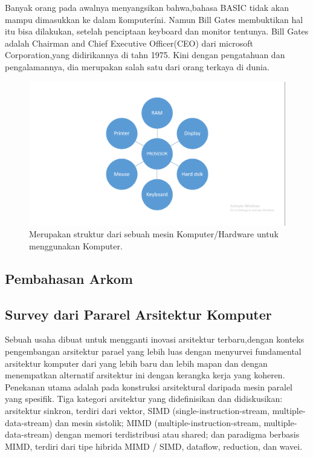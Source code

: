 	Banyak orang pada awalnya menyangsikan bahwa,bahasa BASIC tidak akan mampu dimasukkan ke dalam \'komputer\' ini. 
	Namun Bill Gates membuktikan hal itu bisa dilakukan, setelah penciptaan keyboard dan monitor tentunya. 
	Bill Gates adalah Chairman and Chief Executive Officer(CEO) dari microsoft Corporation,yang didirikannya di tahn 1975.
	Kini dengan pengatahuan dan pengalamannya, dia merupakan salah satu dari orang terkaya di dunia.\cite{syafrizal2005pengantar}
	\begin{figure}[ht]
		\centerline{\includegraphics[width=1\textwidth]{figures/komputermodern.PNG}}
		\caption{Merupakan struktur dari sebuah mesin Komputer/Hardware untuk menggunakan Komputer.}
		\label{komputermodern}
	\end{figure}
	
	\subsection{Pembahasan Arkom}
	\subsection{Survey dari Pararel Arsitektur Komputer}
	Sebuah usaha dibuat untuk mengganti inovasi arsitektur terbaru,dengan konteks pengembangan arsitektur parael yang lebih luas dengan menyurvei fundamental arsitektur komputer dari yang lebih baru dan lebih mapan dan dengan menempatkan alternatif arsitektur ini dengan kerangka kerja yang koheren.
	Penekanan utama adalah pada konstruksi arsitektural daripada mesin paralel yang spesifik.
	Tiga kategori arsitektur yang didefinisikan dan didiskusikan: arsitektur sinkron, terdiri dari vektor, SIMD (single-instruction-stream, multiple-data-stream) dan mesin sistolik; MIMD (multiple-instruction-stream, multiple-data-stream) dengan memori terdistribusi atau shared; dan paradigma berbasis MIMD, terdiri dari tipe hibrida MIMD / SIMD, dataflow, reduction, dan wavei.\cite{duncan1990survey}

